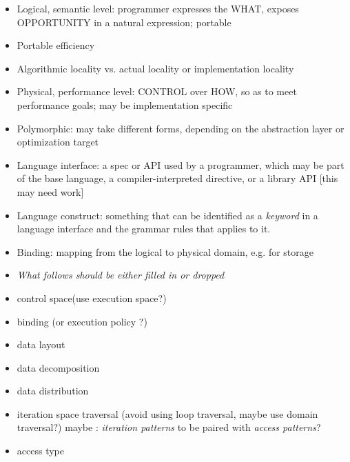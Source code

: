 \begin{itemize}
\begin{itemize}
\begin{itemize}
  \item Logical, semantic level: programmer expresses the WHAT, exposes OPPORTUNITY in a natural expression; portable
  \item Portable efficiency
  \item Algorithmic locality vs. actual locality or implementation locality
  \item Physical, performance level: CONTROL over HOW, so as to meet performance goals; may be implementation specific
  \item Polymorphic: may take different forms, depending on the abstraction layer or optimization target
  \item Language interface: a spec or API used by a programmer, which may be part of the base language, a compiler-interpreted directive, or a library API [this may need work] 
  \item Language construct: something that can be identified as a {\em keyword} in a language interface and the grammar rules that applies to it.

  \item Binding: mapping from the logical to physical domain, e.g. for storage
  \item {\em What follows should be either filled in or dropped}
  \item control space(use execution space?)
  \item binding  (or execution policy ?)
  \item data layout
  \item data decomposition 
  \item data distribution 
  \item iteration space traversal (avoid using loop traversal, maybe use domain traversal?) maybe : {\em iteration patterns} to be paired with {\em access patterns}?
  \item access type
  \end{itemize}



\end{itemize}
\end{itemize}
